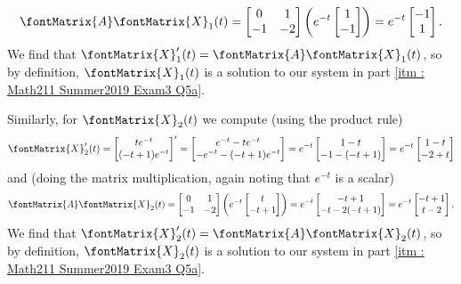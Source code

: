 {\begin{align*}
\fontMatrix{A} \fontMatrix{X}_{1}(t)
=
\begin{bmatrix}%
0	&	1	\\
-1	&	-2
\end{bmatrix}%
\left(
e^{-t}
\begin{bmatrix}%
1	\\
-1
\end{bmatrix}%
\right)
=
e^{-t}
\begin{bmatrix}%
-1	\\
1
\end{bmatrix}%
.
\end{align*}
We find that $\fontMatrix{X}_{1}'(t) = \fontMatrix{A} \fontMatrix{X}_{1}(t)$, so by definition, $\fontMatrix{X}_{1}(t)$ is a solution to our system in part \ref{itm : Math211 Summer2019 Exam3 Q5a}.

Similarly, for $\fontMatrix{X}_{2}(t)$ we compute (using the product rule)
\begin{align*}
\fontMatrix{X}_{2}'(t)
=
\begin{bmatrix}%
t e^{-t}		\\
(-t + 1) e^{-t}
\end{bmatrix}%
'
=
\begin{bmatrix}%
e^{-t} - t e^{-t}		\\
-e^{-t} - (-t + 1) e^{-t}
\end{bmatrix}%
=
e^{-t}
\begin{bmatrix}%
1 - t			\\
-1 - (-t + 1)
\end{bmatrix}%
=
e^{-t}
\begin{bmatrix}%
1 - t	\\
-2 + t
\end{bmatrix}%
\end{align*}
and (doing the matrix multiplication, again noting that $e^{-t}$ is a scalar)
\begin{align*}
\fontMatrix{A} \fontMatrix{X}_{2}(t)
=
\begin{bmatrix}%
0	&	1	\\
-1	&	-2
\end{bmatrix}%
\left(
e^{-t}
\begin{bmatrix}%
t	\\
-t + 1
\end{bmatrix}%
\right)
=
e^{-t}
\begin{bmatrix}%
-t + 1	\\
-t - 2(-t + 1)
\end{bmatrix}%
=
e^{-t}
\begin{bmatrix}%
-t + 1	\\
t - 2
\end{bmatrix}%
.
\end{align*}
We find that $\fontMatrix{X}_{2}'(t) = \fontMatrix{A} \fontMatrix{X}_{2}(t)$, so by definition, $\fontMatrix{X}_{2}(t)$ is a solution to our system in part \ref{itm : Math211 Summer2019 Exam3 Q5a}.}%



